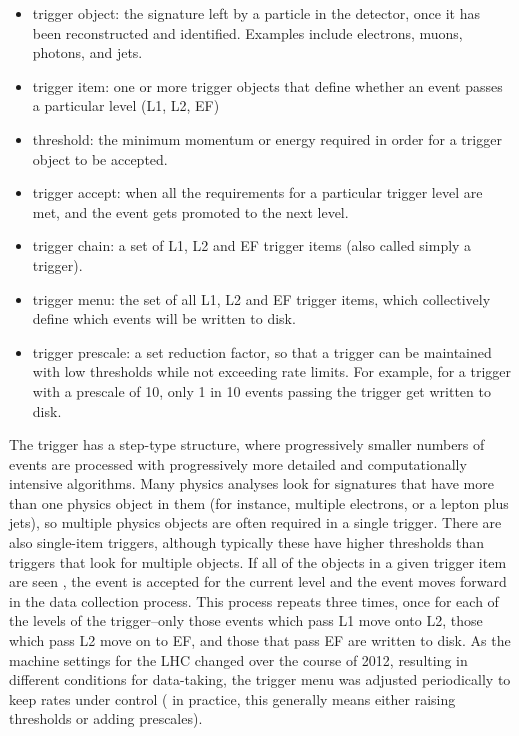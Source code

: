 \begin{itemize}
	\item trigger object: the signature left by a particle in the detector, once it has been reconstructed and identified.  Examples include electrons, muons, photons, and jets.
	\item trigger item: one or more trigger objects that define whether an event passes a particular level (L1, L2, EF)
	\item threshold: the minimum momentum or energy required in order for a trigger object to be accepted.
	\item trigger accept: when all the requirements for a particular trigger level are met, and the event gets promoted to the next level.

	\item trigger chain: a set of L1, L2 and EF trigger items (also called simply a trigger).
	\item trigger menu: the set of all L1, L2 and EF trigger items, which collectively define which events will be written to disk.
	\item trigger prescale: a set reduction factor, so that a trigger can be maintained with low thresholds while not exceeding rate limits.  For example, for a trigger with a prescale of 10, only 1 in 10 events passing the trigger get written to disk.
\end{itemize}
 

The trigger has a step-type structure, where progressively smaller numbers of events are processed with progressively more 
detailed and computationally intensive algorithms.  Many physics analyses look for signatures that have more than one physics object in 
them (for instance, multiple electrons, or a lepton plus jets), so multiple physics objects are often 
required in a single trigger.  There are also single-item triggers, although typically these have higher thresholds 
than triggers that look for multiple objects.  If all of the objects in a given trigger item are seen
, the event is accepted for the current level and the event moves forward in the data collection process.  
This process repeats three times, once for each of the levels of the trigger--only those events which 
pass L1 move onto L2, those which pass L2 move on to EF, and those that pass EF 
are written to disk.   As the machine settings for the LHC changed over the course of 2012, resulting 
in different conditions for data-taking, the trigger menu was adjusted periodically to keep rates under control (
in practice, this generally means either raising thresholds or adding prescales).  


